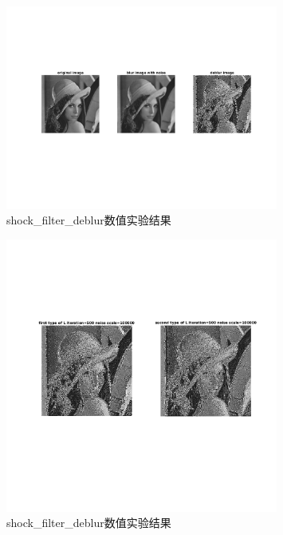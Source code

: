 \documentclass[a4paper, UTF8]{ctexrep}
\begin{document}
				\begin{figure}[htbp!]
					\centering
					\includegraphics[width=0.8\textwidth]{hw2_fig13.png}
					\caption{shock\_filter\_deblur数值实验结果}
					\label{}
				\end{figure}
				\begin{figure}[htbp!]
					\centering
					\includegraphics[width=0.8\textwidth]{hw2_fig14.png}
					\caption{shock\_filter\_deblur数值实验结果}
					\label{}
				\end{figure}
				\clearpage
\end{document}
